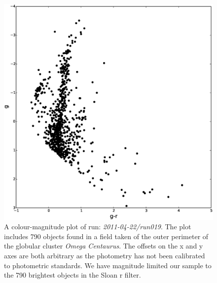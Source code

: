 \begin{figure}
\centering
\includegraphics[width=120mm]{images/2011-04-22-run019-omegacen-colourmagnitude.eps}
\caption{A colour-magnitude plot of run: \emph{2011-04-22/run019}. The plot includes 790 objects found in a field taken of the outer perimeter of the globular cluster \emph{Omega Centaurus}. The offsets on the x and y axes are both arbitrary as the photometry has not been calibrated to photometric standards. We have magnitude limited our sample to the 790 brightest objects in the Sloan r filter.}
\label{fig:OmegaCen-colourmagnitude}
\end{figure}

